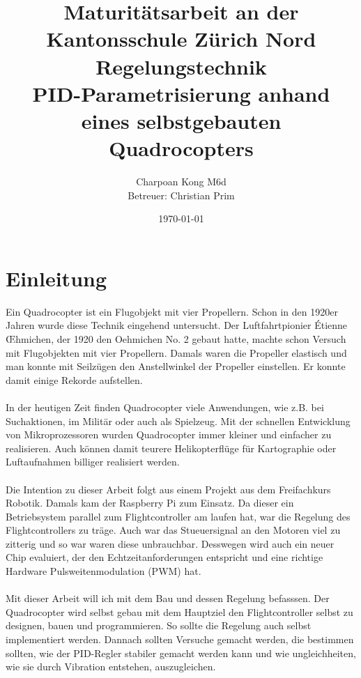 \documentclass[12pt,a4paper, ngerman]{article}
\begin{document}
\title{\large Maturitätsarbeit an der Kantonsschule Zürich Nord \\ \Huge Regelungstechnik \\ \huge PID-Parametrisierung anhand eines selbstgebauten Quadrocopters}
\author{Charpoan Kong M6d \\ Betreuer: Christian Prim}
\date{\today}
\maketitle
{}





\newpage
\clearpage
{}
\tableofcontents
\newpage
{}

\section{Einleitung}
Ein Quadrocopter ist ein Flugobjekt mit vier Propellern. Schon in den 1920er Jahren wurde diese Technik eingehend untersucht. Der Luftfahrtpionier Étienne \OE hmichen, der 1920 den Oehmichen No. 2 gebaut hatte, machte schon Versuch mit Flugobjekten mit vier Propellern. Damals waren die Propeller elastisch und man konnte mit Seilzügen den Anstellwinkel der Propeller einstellen. Er konnte damit einige Rekorde aufstellen.\cite{website:Wikipedia_Quadrocopter}\\ \\
In der heutigen Zeit finden Quadrocopter viele Anwendungen, wie z.B. bei Suchaktionen, im Militär oder auch als Spielzeug. Mit der schnellen Entwicklung von Mikroprozessoren wurden Quadrocopter immer kleiner und einfacher zu realisieren. Auch können damit teurere Helikopterflüge für Kartographie oder Luftaufnahmen billiger realisiert werden.\cite{website:Wikipedia_Quad_Einsatz}\\ \\
Die Intention zu dieser Arbeit folgt aus einem Projekt aus dem Freifachkurs Robotik. Damals kam der Raspberry Pi zum Einsatz. Da dieser ein Betriebsystem parallel zum Flightcontroller am laufen hat, war die Regelung des Flightcontrollers zu träge. Auch war das Stueuersignal an den Motoren viel zu zitterig und so war waren diese unbrauchbar. Desswegen wird auch ein neuer Chip evaluiert, der den Echtzeitanforderungen entspricht und eine richtige Hardware Pulsweitenmodulation (PWM) hat. \\ \\
\iffalse
Mit dieser Arbeit will ich mit dem Bau und dessen Regelung befasssen. Der Quadrocopter wird selbst gebau mit dem Hauptziel den Flightcontroller selbst zu designen, bauen und programmieren. So sollte die Regelung auch selbst implementiert werden. Dannach sollten Versuche gemacht werden, die bestimmen sollten, wie der PID-Regler stabiler gemacht werden kann und wie ungleichheiten, wie sie durch Vibration entstehen, auszugleichen. 
\end{document}
